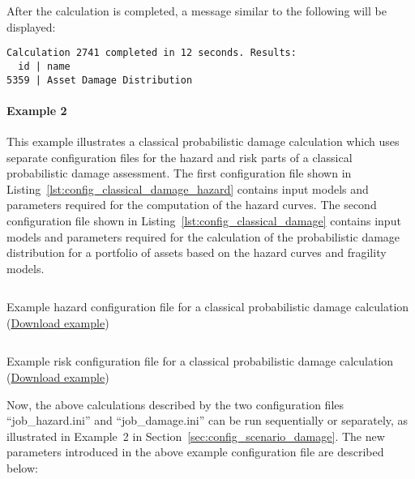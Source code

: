 After the calculation is completed, a message similar to the following will be
displayed:

\begin{verbatim}
Calculation 2741 completed in 12 seconds. Results:
  id | name
5359 | Asset Damage Distribution
\end{verbatim}


\paragraph{Example 2}

This example illustrates a classical probabilistic damage calculation which
uses separate configuration files for the hazard and risk parts of a classical
probabilistic damage assessment. The first configuration file shown in
Listing~\ref{lst:config_classical_damage_hazard} contains input models and parameters
required for the computation of the hazard curves. The second configuration
file shown in Listing~\ref{lst:config_classical_damage} contains input models
and parameters required for the calculation of the probabilistic damage
distribution for a portfolio of assets based on the hazard curves and
fragility models.

\begin{listing}[htbp]
  \inputminted[firstline=1,firstnumber=1,fontsize=\footnotesize,frame=single,linenos,bgcolor=lightgray,label=job\_hazard.ini]{ini}{oqum/risk/verbatim/config_classical_hazard.ini}
  \caption{Example hazard configuration file for a classical probabilistic damage calculation (\href{https://raw.githubusercontent.com/gem/oq-engine/master/doc/manual/oqum/risk/verbatim/config_classical_hazard.ini}{Download example})}
  \label{lst:config_classical_damage_hazard}
\end{listing}

\begin{listing}[htbp]
  \inputminted[firstline=1,firstnumber=1,fontsize=\footnotesize,frame=single,linenos,bgcolor=lightgray,label=job\_damage.ini]{ini}{oqum/risk/verbatim/config_classical_damage.ini}
  \caption{Example risk configuration file for a classical probabilistic damage calculation (\href{https://raw.githubusercontent.com/gem/oq-engine/master/doc/manual/oqum/risk/verbatim/config_classical_damage.ini}{Download example})}
  \label{lst:config_classical_damage}
\end{listing}

Now, the above calculations described by the two configuration files
``job\_hazard.ini'' and ``job\_damage.ini'' can be run sequentially or
separately, as illustrated in Example~2 in
Section~\ref{sec:config_scenario_damage}. The new parameters introduced in the
above example configuration file are described below:


